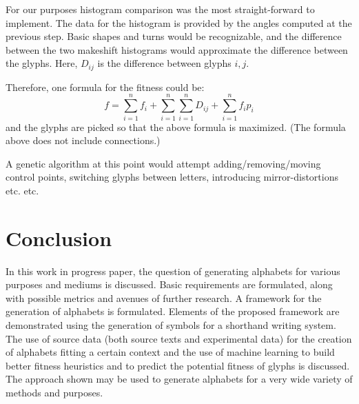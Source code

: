 \documentclass[conference]{IEEEtran}
\begin{document}
For our purposes histogram comparison was the most straight-forward to implement. The data for the histogram is provided by the angles computed at the previous step. Basic shapes and turns would be recognizable, and the difference between the two makeshift histograms would approximate the difference between the glyphs. Here, \(D_{ij}\) is the difference between glyphs \(i, j\).

Therefore, one formula for the fitness could be:
\[
f=\sum^{n}_{i=1}f_i+
\sum^{n}_{i=1}\sum^{n}_{i=1}D_{ij}+
\sum^{n}_{i=1}f_ip_i
\]
and the glyphs are picked so that the above formula is maximized. (The formula above does not include connections.)

A genetic algorithm at this point would attempt adding/removing/moving control points, switching glyphs between letters, introducing mirror-distortions etc. etc.


\section{Conclusion}
In this work in progress paper, the question of generating alphabets for various purposes and mediums is discussed. Basic requirements are formulated, along with possible metrics and avenues of further research. A framework for the generation of alphabets is formulated. Elements of the proposed framework are demonstrated using the generation of symbols for a shorthand writing system. The use of source data (both source texts and experimental data) for the creation of alphabets fitting a
certain context and the use of machine learning to build better fitness heuristics and to predict the potential fitness of glyphs is discussed. The approach shown may be used to generate alphabets for a very wide variety of methods and purposes.


\end{document}
